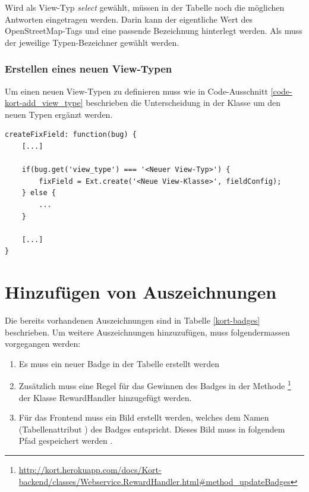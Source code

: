 Wird als View-Typ \emph{select} gewählt, müssen in der Tabelle  noch die möglichen Antworten eingetragen werden.
Darin kann der eigentliche Wert des \gls{OpenStreetMap}-Tags und eine passende Bezeichnung hinterlegt werden.
Als  muss der jeweilige Typen-Bezeichner gewählt werden.

\subsubsection{Erstellen eines neuen View-Typen}
Um einen neuen View-Typen zu definieren muss wie in Code-Ausschnitt \ref{code-kort-add_view_type} beschrieben die Unterscheidung in der Klasse  um den neuen Typen ergänzt werden.

\lstset{language=JavaScript}
\begin{lstlisting}[caption=Unterscheidung der View-Typen in Kort.view.bugmap.fix.Form, label=code-kort-add_view_type]
createFixField: function(bug) {
	[...]
	
	if(bug.get('view_type') === '<Neuer View-Typ>') {
		fixField = Ext.create('<Neue View-Klasse>', fieldConfig);
	} else {
		...
	}
	
	[...]
}
\end{lstlisting}

\section{Hinzufügen von Auszeichnungen}
\label{kort-additional-badges}
Die bereits vorhandenen Auszeichnungen sind in Tabelle \ref{kort-badges} beschrieben. Um weitere Auszeichnungen hinzuzufügen, muss folgendermassen vorgegangen werden:

\begin{enumerate}
\item Es muss ein neuer Badge in der Tabelle  erstellt werden
\item Zusätzlich muss eine Regel für das Gewinnen des Badges in der Methode \footnote{\url{http://kort.herokuapp.com/docs/Kort-backend/classes/Webservice.RewardHandler.html\#method_updateBadges}} der Klasse RewardHandler hinzugefügt werden.
\item Für das Frontend muss ein Bild erstellt werden, welches dem Namen (Tabellenattribut ) des Badges entspricht. Dieses Bild muss in folgendem Pfad gespeichert werden .
\end{enumerate}

